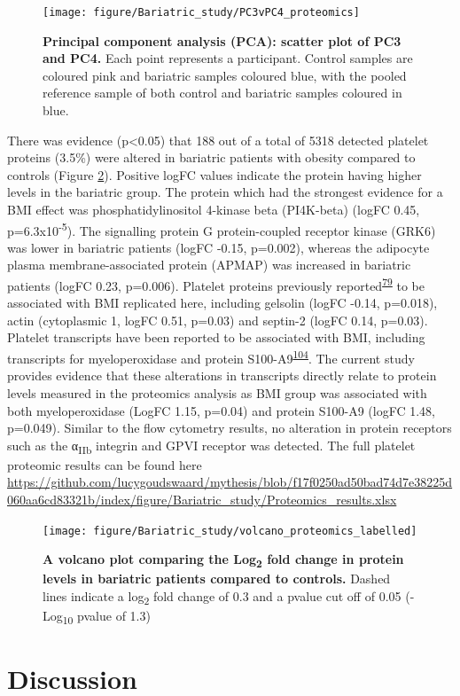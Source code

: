 \documentclass[11pt,twoside]{bristolthesis}
\begin{document}
\begin{figure}
\texttt{[image: figure/Bariatric\_study/PC3vPC4\_proteomics]} \caption[Principal component analysis (PCA): scatter plot of PC3 and PC4.]{\textbf{Principal component analysis (PCA): scatter plot of PC3 and PC4.} Each point represents a participant. Control samples are coloured pink and bariatric samples coloured blue, with the pooled reference sample of both control and bariatric samples coloured in blue.}\label{fig:pca2}
\end{figure}
There was evidence (p\textless0.05) that 188 out of a total of 5318 detected platelet proteins (3.5\%) were altered in bariatric patients with obesity compared to controls (Figure \ref{fig:volcano}). Positive logFC values indicate the protein having higher levels in the bariatric group. The protein which had the strongest evidence for a BMI effect was phosphatidylinositol 4-kinase beta (PI4K-beta) (logFC 0.45, p=6.3x10\textsuperscript{-5}). The signalling protein G protein-coupled receptor kinase (GRK6) was lower in bariatric patients (logFC -0.15, p=0.002), whereas the adipocyte plasma membrane-associated protein (APMAP) was increased in bariatric patients (logFC 0.23, p=0.006). Platelet proteins previously reported\textsuperscript{\protect\hyperlink{ref-Barrachina2019}{79}} to be associated with BMI replicated here, including gelsolin (logFC -0.14, p=0.018), actin (cytoplasmic 1, logFC 0.51, p=0.03) and septin-2 (logFC 0.14, p=0.03). Platelet transcripts have been reported to be associated with BMI, including transcripts for myeloperoxidase and protein S100-A9\textsuperscript{\protect\hyperlink{ref-Freedman2010}{104}}. The current study provides evidence that these alterations in transcripts directly relate to protein levels measured in the proteomics analysis as BMI group was associated with both myeloperoxidase (LogFC 1.15, p=0.04) and protein S100-A9 (logFC 1.48, p=0.049). Similar to the flow cytometry results, no alteration in protein receptors such as the α\textsubscript{IIb} integrin and GPVI receptor was detected. The full platelet proteomic results can be found here \url{https://github.com/lucygoudswaard/mythesis/blob/f17f0250ad50bad74d7e38225d060aa6cd83321b/index/figure/Bariatric_study/Proteomics_results.xlsx}



\begin{figure}
\texttt{[image: figure/Bariatric\_study/volcano\_proteomics\_labelled]} \caption[A volcano plot comparing the Log\textsubscript{2} fold change in protein levels in bariatric patients compared to controls]{\textbf{A volcano plot comparing the Log\textsubscript{2} fold change in protein levels in bariatric patients compared to controls.} Dashed lines indicate a log\textsubscript{2} fold change of 0.3 and a pvalue cut off of 0.05 (-Log\textsubscript{10} pvalue of 1.3)}\label{fig:volcano}
\end{figure}
\hypertarget{discussion-1}{%
\section{Discussion}\label{discussion-1}}
\end{document}
